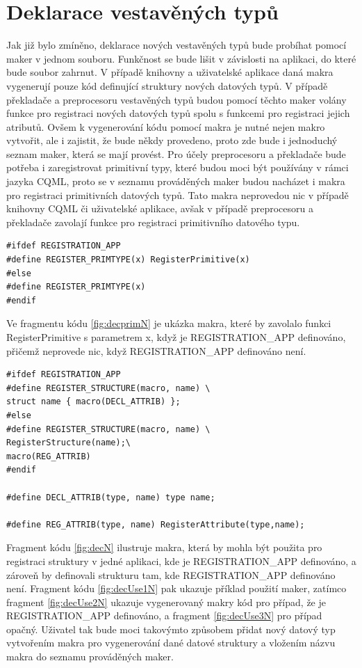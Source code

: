 \documentclass[report,11pt]{elsarticle}
\begin{document}
\section{\label{SEC:macN}Deklarace vestavěných typů}
Jak již bylo zmíněno, deklarace nových vestavěných typů bude probíhat pomocí maker v jednom souboru. Funkčnost se bude lišit v závislosti na aplikaci, do které bude soubor zahrnut. V případě knihovny a uživatelské aplikace daná makra vygenerují pouze kód definující struktury nových datových typů. V případě překladače a preprocesoru vestavěných typů budou pomocí těchto maker volány funkce pro registraci nových datových typů spolu s funkcemi pro registraci jejich atributů. Ovšem k vygenerování kódu pomocí makra je nutné nejen makro vytvořit, ale i zajistit, že bude někdy provedeno, proto zde bude i jednoduchý seznam maker, která se mají provést. Pro účely preprocesoru a překladače bude potřeba i zaregistrovat primitivní typy, které budou moci být používány v rámci jazyka CQML, proto se v seznamu prováděných maker budou nacházet i makra pro registraci primitivních datových typů. Tato makra neprovedou nic v případě knihovny CQML či uživatelské aplikace, avšak v případě preprocesoru a překladače zavolají funkce pro registraci primitivního datového typu.

\begin{lstlisting}[frame=single,caption=Řešení v pseudokódu problematického použití operátoru "." v přiřazovacím výroku,label=lst:decprimN]
#ifdef REGISTRATION_APP
#define REGISTER_PRIMTYPE(x) RegisterPrimitive(x)
#else
#define REGISTER_PRIMTYPE(x)
#endif
\end{lstlisting}
Ve fragmentu kódu \ref{fig:decprimN} je ukázka makra, které by zavolalo funkci RegisterPrimitive s parametrem x, když je REGISTRATION\_APP definováno, přičemž neprovede nic, když  REGISTRATION\_APP definováno není.


\begin{lstlisting}[frame=single,caption=Řešení v pseudokódu problematického použití operátoru "." v přiřazovacím výroku,label=lst:decN]
#ifdef REGISTRATION_APP
#define REGISTER_STRUCTURE(macro, name) \
struct name { macro(DECL_ATTRIB) };
#else
#define REGISTER_STRUCTURE(macro, name) \
RegisterStructure(name);\
macro(REG_ATTRIB) 
#endif

#define DECL_ATTRIB(type, name) type name;

#define REG_ATTRIB(type, name) RegisterAttribute(type,name);
\end{lstlisting}
  
Fragment kódu \ref{fig:decN} ilustruje makra, která by mohla být použita pro registraci struktury v jedné aplikaci, kde je REGISTRATION\_APP definováno, a zároveň by definovali strukturu tam, kde REGISTRATION\_APP definováno není. Fragment kódu \ref{fig:decUse1N} pak ukazuje příklad použití maker, zatímco fragment \ref{fig:decUse2N} ukazuje vygenerovaný makry kód pro případ, že je REGISTRATION\_APP definováno, a fragment \ref{fig:decUse3N} pro případ opačný. Uživatel tak bude moci takovýmto způsobem přidat nový datový typ vytvořením makra pro vygenerování dané datové struktury a vložením názvu makra do seznamu prováděných maker.
\end{document}
